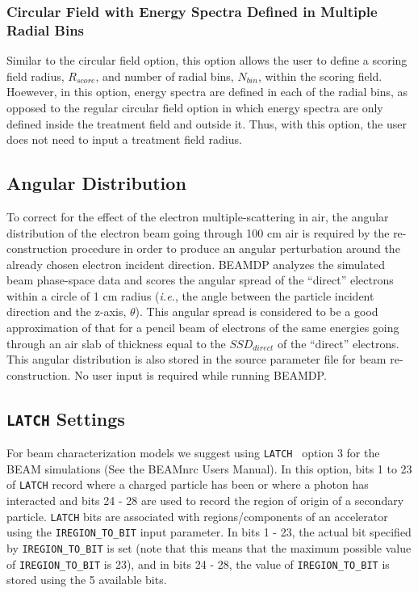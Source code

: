 \documentclass[12pt,twoside]{article}
\newcommand{\ie}{{\em i.e.}}
\begin{document}
\subsubsection{Circular Field with Energy Spectra Defined in Multiple Radial
               Bins}

Similar to the circular field option, this option allows the user to define
a scoring field radius, $R_{score}$, and number
of radial bins, $N_{bin}$, within the scoring field.  Hoewever, in this option,
energy spectra are defined in each of the radial bins, as opposed to the
regular circular field option in which energy spectra are only defined inside
the treatment field and outside it.  Thus, with this option, the user does
not need to input a treatment field radius.

\subsection{Angular Distribution}
To correct for the effect of the electron multiple-scattering in air, the
angular distribution of the electron beam going through 100 cm air is
required by the re-construction procedure in order to produce an angular
perturbation around the already chosen electron incident direction. BEAMDP
analyzes the simulated beam phase-space data and scores the angular
spread  of the ``direct'' electrons within a circle of 1 cm radius (\ie,
the angle between the particle incident direction and the z-axis,
$\theta$). This angular spread is considered to be a good approximation of
that for a pencil beam of electrons of the same energies going through an
air slab of thickness equal to the $SSD_{direct}$ of the ``direct''
electrons. This angular distribution is also stored in the source
parameter file for beam re-construction.  No user input is required while
running BEAMDP.

\subsection{{\tt LATCH} Settings}
For beam characterization models we suggest using {\tt LATCH } option 3
for the BEAM simulations (See the BEAMnrc Users Manual\cite{Ro04a}).
In this option, bits 1 to 23 of {\tt LATCH} record where a charged particle
has been or where a photon has interacted and bits 24 - 28 are used to record
the region of origin of a secondary particle.  {\tt LATCH} bits are associated
with
regions/components of an accelerator using the {\tt IREGION\_TO\_BIT}
input parameter.  In bits 1 - 23, the actual bit specified by
{\tt IREGION\_TO\_BIT} is set (note that this means that the maximum
possible value of {\tt IREGION\_TO\_BIT} is 23), and in bits 24 - 28, the value of
{\tt IREGION\_TO\_BIT} is stored using the 5 available bits.
\end{document}
